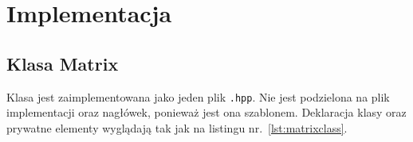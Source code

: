 	\newpage
\section{Implementacja}		%

\subsection{Klasa Matrix} \label{sec:Matrix}

Klasa jest zaimplementowana jako jeden plik \texttt{.hpp}. Nie jest podzielona na plik implementacji oraz nagłówek, ponieważ jest ona szablonem. Deklaracja klasy oraz prywatne elementy wyglądają tak jak na listingu nr.~\ref{lst:matrixclass}.


